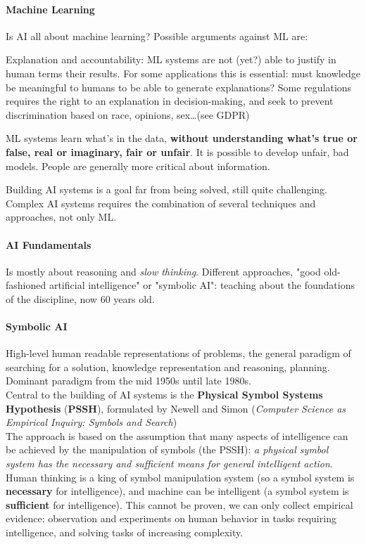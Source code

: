 \documentclass[10pt]{report}
\begin{document}
\paragraph{Machine Learning} Is AI all about machine learning? Possible arguments against ML are:
\begin{list}{}{}
	\item Explanation and accountability: ML systems are not (yet?) able to justify in human terms their results. For some applications this is essential: must knowledge be meaningful to humans to be able to generate explanations? Some regulations requires the right to an explanation in decision-making, and seek to prevent discrimination based on race, opinions, sex\ldots (see GDPR)
	\item ML systems learn what's in the data, \textbf{without understanding what's true or false, real or imaginary, fair or unfair}. It is possible to develop unfair, bad models. People are generally more critical about information.
\end{list}
Building AI systems is a goal far from being solved, still quite challenging. Complex AI systems requires the combination of several techniques and approaches, not only ML.
\paragraph{AI Fundamentals} Is mostly about reasoning and \textit{slow thinking}. Different approaches, "good old-fashioned artificial intelligence" or "symbolic AI": teaching about the foundations of the discipline, now 60 years old.
\paragraph{Symbolic AI} High-level human readable representations of problems, the general paradigm of searching for a solution, knowledge representation and reasoning, planning. Dominant paradigm from the mid 1950s until late 1980s.\\
Central to the building of AI systems is the \textbf{Physical Symbol Systems Hypothesis} (\textbf{PSSH}), formulated by Newell and Simon (\textit{Computer Science as Empirical Inquiry: Symbols and Search})\\
The approach is based on the assumption that many aspects of intelligence can be achieved by the manipulation of symbols (the PSSH): \textit{a physical symbol system has the necessary and sufficient means for general intelligent action}.\\
Human thinking is a king of symbol manipulation system (so a symbol system is \textbf{necessary} for intelligence), and machine can be intelligent (a symbol system is \textbf{sufficient} for intelligence). This cannot be proven, we can only collect empirical evidence: observation and experiments on human behavior in tasks requiring intelligence, and solving tasks of increasing complexity.
\end{document}
